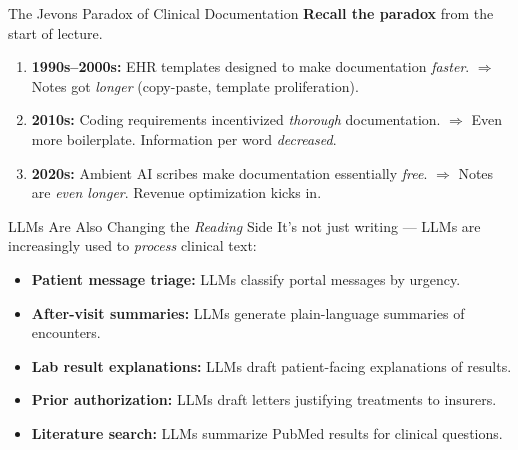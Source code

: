 \documentclass[aspectratio=169,11pt]{beamer}
\begin{document}
\begin{frame}{The Jevons Paradox of Clinical Documentation}
\textbf{Recall the paradox} from the start of lecture.

\vspace{0.2em}
\small
\begin{enumerate}[<+->]\setlength\itemsep{0.1em}
  \item \textbf{1990s--2000s:} EHR templates designed to make documentation \emph{faster}.
  $\Rightarrow$ Notes got \emph{longer} (copy-paste, template proliferation).

  \item \textbf{2010s:} Coding requirements incentivized \emph{thorough} documentation.
  $\Rightarrow$ Even more boilerplate. Information per word \emph{decreased}.

  \item \textbf{2020s:} Ambient AI scribes make documentation essentially \emph{free}.
  $\Rightarrow$ Notes are \emph{even longer}. Revenue optimization kicks in.
\end{enumerate}
\normalsize

\end{frame}

\begin{frame}{LLMs Are Also Changing the \emph{Reading} Side}
It's not just writing --- LLMs are increasingly used to \emph{process} clinical text:

\vspace{0.15em}
\begin{itemize}[<+->]\setlength\itemsep{0.02em}
  \item \textbf{Patient message triage:} LLMs classify portal messages by urgency.
  \item \textbf{After-visit summaries:} LLMs generate plain-language summaries of encounters.
  \item \textbf{Lab result explanations:} LLMs draft patient-facing explanations of results.
  \item \textbf{Prior authorization:} LLMs draft letters justifying treatments to insurers.
  \item \textbf{Literature search:} LLMs summarize PubMed results for clinical questions.
\end{itemize}

\end{frame}
\end{document}
